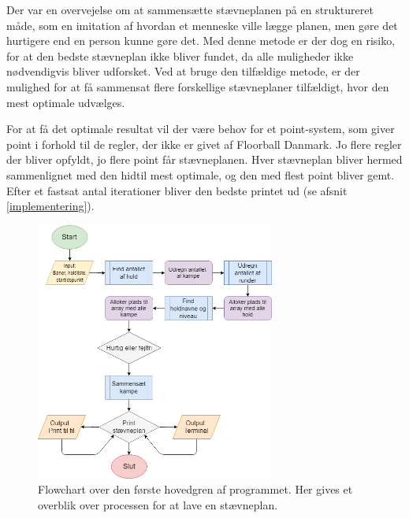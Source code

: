 \par
Der var en overvejelse om at sammensætte stævneplanen på en struktureret måde, som en imitation af hvordan et menneske ville lægge planen, men gøre det hurtigere end en person kunne gøre det. Med denne metode er der dog en risiko, for at den bedste stævneplan ikke bliver fundet, da alle muligheder ikke nødvendigvis bliver udforsket. Ved at bruge den tilfældige metode, er der mulighed for at få sammensat flere forskellige stævneplaner tilfældigt, hvor den mest optimale udvælges.
\par
For at få det optimale resultat vil der være behov for et point-system, som giver point i forhold til de regler, der ikke er givet af Floorball Danmark. Jo flere regler der bliver opfyldt, jo flere point får stævneplanen. Hver stævneplan bliver hermed sammenlignet med den hidtil mest optimale, og den med flest point bliver gemt. Efter et fastsat antal iterationer bliver den bedste printet ud (se afsnit \ref{implementering}).


\begin{figure}[H]
  \centering
  \includegraphics[width=0.7\textwidth]{figures/Lav_staevneplan.png}
  \caption{Flowchart over den første hovedgren af programmet. Her gives et overblik over processen for at lave en stævneplan.}
  \label{fig:lav-flowchart}
\end{figure}

